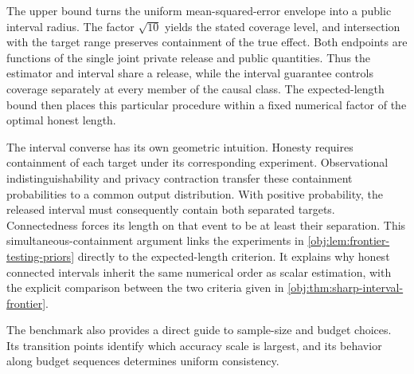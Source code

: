 
The upper bound turns the uniform mean-squared-error envelope into a public interval radius. The factor \(\sqrt{10}\) yields the stated coverage level, and intersection with the target range preserves containment of the true effect. Both endpoints are functions of the single joint private release and public quantities. Thus the estimator and interval share a release, while the interval guarantee controls coverage separately at every member of the causal class. The expected-length bound then places this particular procedure within a fixed numerical factor of the optimal honest length.

The interval converse has its own geometric intuition. Honesty requires containment of each target under its corresponding experiment. Observational indistinguishability and privacy contraction transfer these containment probabilities to a common output distribution. With positive probability, the released interval must consequently contain both separated targets. Connectedness forces its length on that event to be at least their separation. This simultaneous-containment argument links the experiments in \cref{obj:lem:frontier-testing-priors} directly to the expected-length criterion. It explains why honest connected intervals inherit the same numerical order as scalar estimation, with the explicit comparison between the two criteria given in \cref{obj:thm:sharp-interval-frontier}.

The benchmark also provides a direct guide to sample-size and budget choices. Its transition points identify which accuracy scale is largest, and its behavior along budget sequences determines uniform consistency.

